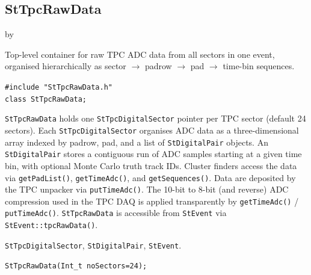 \documentclass[twoside]{article}
\newcommand{\entrylabel}[1]{\mbox{\textbf{{#1}}}\hfil}%
\newenvironment{entry}
{\begin{list}{}%
    {\renewcommand{\makelabel}{\entrylabel}%
     \setlength{\labelwidth}{90pt}%
     \setlength{\leftmargin}{\labelwidth}
     \advance\leftmargin by \labelsep%
      }%
    }%
  {\end{list}}
\newcommand{\Entrylabel}[1]%
{\raisebox{0pt}[1ex][0pt]{\makebox[\labelwidth][l]%
    {\parbox[t]{\labelwidth}{\hspace{0pt}\textbf{{#1}}}}}}
\newenvironment{Entry}%
{\renewcommand{\entrylabel}{\Entrylabel}\begin{entry}}%
  {\end{entry}}
\begin{document}
\subsection{StTpcRawData}
\label{sec:StTpcRawData}
\begin{Entry}
\item[Summary]
    Top-level container for raw TPC ADC data from all sectors in one event,
    organised hierarchically as sector $\to$ padrow $\to$ pad $\to$ time-bin
    sequences.

\item[Synopsis]
    \verb+#include "StTpcRawData.h"+\\
    \verb+class StTpcRawData;+\\

\item[Description]
    \texttt{StTpcRawData} holds one \texttt{StTpcDigitalSector} pointer per
    TPC sector (default 24 sectors).  Each \texttt{StTpcDigitalSector}
    organises ADC data as a three-dimensional array indexed by padrow, pad, and
    a list of \texttt{StDigitalPair} objects.  An \texttt{StDigitalPair}
    stores a contiguous run of ADC samples starting at a given time bin, with
    optional Monte Carlo truth track IDs.  Cluster finders access the data via
    \texttt{getPadList()}, \texttt{getTimeAdc()}, and \texttt{getSequences()}.
    Data are deposited by the TPC unpacker via \texttt{putTimeAdc()}.
    The 10-bit to 8-bit (and reverse) ADC compression used in the TPC DAQ is
    applied transparently by \texttt{getTimeAdc()} / \texttt{putTimeAdc()}.
    \texttt{StTpcRawData} is accessible from \texttt{StEvent} via
    \texttt{StEvent::tpcRawData()}.

\item[Related Classes]
    \texttt{StTpcDigitalSector}, \texttt{StDigitalPair}, \texttt{StEvent}.

\item[Public\\ Constructors]
    \verb+StTpcRawData(Int_t noSectors=24);+\\


\end{Entry}
\end{document}
